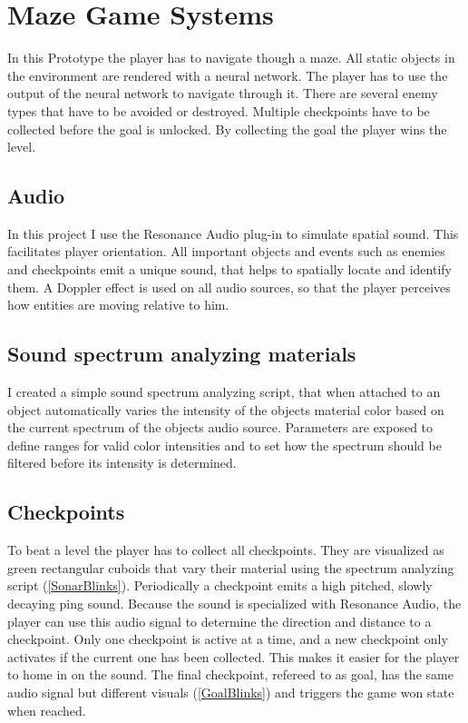 
\chapter{Maze Game Systems}\label{MazeGameSystems}
 In this Prototype the player has to navigate though a maze. All static objects in the environment are rendered with a neural network. The player has to use the output of the neural network to navigate through it. There are several enemy types that have to be avoided or destroyed. Multiple checkpoints have to be collected before the goal is unlocked. By collecting the goal the player wins the level.

\section{Audio}
In this project I use the Resonance Audio plug-in to simulate spatial sound. This facilitates player orientation. All important objects and events such as enemies and checkpoints emit a unique sound, that helps to spatially locate and identify them. A Doppler effect is used on all audio sources, so that the player perceives how entities are moving relative to him.


\section{Sound spectrum analyzing materials}
I created a simple sound spectrum analyzing script, that when attached to an object automatically varies the intensity of the objects material color based on the current spectrum of the objects audio source. Parameters are exposed to define ranges for valid color intensities and to set how the spectrum should be filtered before its intensity is determined.


\section{Checkpoints}
To beat a level the player has to collect all checkpoints. They are visualized as green rectangular cuboids that vary their material using the spectrum analyzing script (\cref{SonarBlinks}). Periodically a checkpoint emits a high pitched, slowly decaying ping sound. Because the sound is specialized with Resonance Audio, the player can use this audio signal to determine the direction and distance to a checkpoint. Only one checkpoint is active at a time, and a new checkpoint only activates if the current one has been collected. This makes it easier for the player to home in on the sound. The final checkpoint, refereed to as goal, has the same audio signal but different visuals (\cref{GoalBlinks}) and triggers the game won state when reached.


